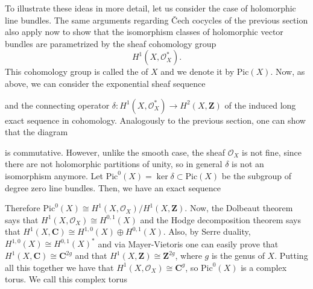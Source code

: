 \documentclass[12pt,a4paper]{book}
\theoremstyle{definition} \newtheorem{defn}[thm]{Definition}
\theoremstyle{definition} \newtheorem{ejemplo}[thm]{Example}
\theoremstyle{remark} \newtheorem{rem}[thm]{Remark}
\def\OO{\mathscr{O}}
\def\CC{\mathbf{C}}
\def\ZZ{\mathbf{Z}}
\def\Pic{\mathrm{Pic}}
\let\emph\relax
\begin{document}
       To illustrate these ideas in more detail, let us consider the case of holomorphic line bundles. The same arguments regarding \v{C}ech cocycles of the previous section also apply now to show that the isomorphism classes of holomorphic vector bundles are parametrized by the sheaf cohomology group
       \begin{equation*}
	 H^1(X,\OO_X^*).
       \end{equation*}
       This cohomology group is called the \emph{Picard group} of $X$ and we denote it by $\Pic(X)$.
       Now, as above, we can consider the exponential sheaf sequence
      \begin{center}
       \end{center}
       and the connecting operator $\delta:H^1(X,\OO_X^*)\rightarrow H^2(X,\ZZ)$ of the induced long exact sequence in cohomology. Analogously to the previous section, one can show that the diagram 
      \begin{center}
       \end{center}
       is commutative. However, unlike the smooth case, the sheaf $\OO_X$ is not fine, since there are not holomorphic partitions of unity, so in general $\delta$ is not an isomorphism anymore. Let $\Pic^0(X)=\ker \delta \subset \Pic(X)$ be the subgroup of degree zero line bundles. Then, we have an exact sequence
      \begin{center}
       \end{center}
       Therefore $\Pic^0(X)\cong H^1(X,\OO_X)/H^1(X,\ZZ)$. Now, the Dolbeaut theorem says that $H^1(X,\OO_X)\cong H^{0,1}(X)$ and the Hodge decomposition theorem says that $H^1(X,\CC)\cong H^{1,0}(X) \oplus H^{0,1}(X)$. Also, by Serre duality, $H^{1,0}(X)\cong H^{0,1}(X)^*$ and via Mayer-Vietoris one can easily prove that $H^1(X,\CC)\cong\CC^{2g}$ and that $H^1(X,\ZZ)\cong\ZZ^{2g}$, where $g$ is the genus of $X$. Putting all this together we have that $H^1(X,\OO_X)\cong \CC^{g}$, so $\Pic^0(X)$ is a complex torus. We call this complex torus 
\end{document}

